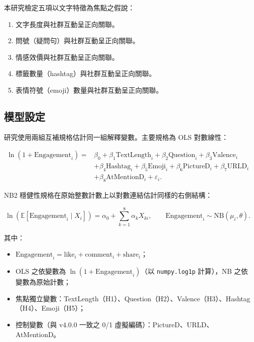 \documentclass[12pt,a4paper]{ctexart}
\begin{document}
本研究檢定五項以文字特徵為焦點之假說：

\begin{enumerate}[label=H\arabic*.]
    \item 文字長度與社群互動呈正向關聯。
    \item 問號（疑問句）與社群互動呈正向關聯。
    \item 情感效價與社群互動呈正向關聯。
    \item 標籤數量（hashtag）與社群互動呈正向關聯。
    \item 表情符號（emoji）數量與社群互動呈正向關聯。
\end{enumerate}

\subsection{模型設定}

研究使用兩組互補規格估計同一組解釋變數。主要規格為 OLS 對數線性：

\begin{equation}
\begin{aligned}
\ln(1 + \text{Engagement}_i) = {}& \beta_0 + \beta_1\text{TextLength}_i + \beta_2\text{Question}_i + \beta_3\text{Valence}_i \\
& + \beta_4\text{Hashtag}_i + \beta_5\text{Emoji}_i + \beta_6\text{PictureD}_i + \beta_7\text{URLD}_i \\
& + \beta_8\text{AtMentionD}_i + \varepsilon_i.
\end{aligned}
\end{equation}

NB2 穩健性規格在原始整數計數上以對數連結估計同樣的右側結構：

\begin{equation}
\ln(\mathbb{E}[\text{Engagement}_i \mid X_i]) = \alpha_0 + \sum_{k=1}^{8}\alpha_k X_{ki},\qquad \text{Engagement}_i \sim \text{NB}(\mu_i, \theta).
\end{equation}

其中：
\begin{itemize}
    \item $\text{Engagement}_i = \text{like}_i + \text{comment}_i + \text{share}_i$；
    \item OLS 之依變數為 $\ln(1+\text{Engagement}_i)$（以 \texttt{numpy.log1p} 計算），NB 之依變數為原始計數；
    \item 焦點獨立變數：TextLength（H1）、Question（H2）、Valence（H3）、Hashtag（H4）、Emoji（H5）；
    \item 控制變數（與 v4.0.0 一致之 0/1 虛擬編碼）：PictureD、URLD、AtMentionD。
\end{itemize}
\end{document}
